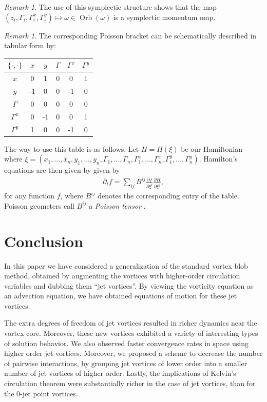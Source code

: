 \documentclass[12pt]{amsart}
\newcommand{\pder}[2]{\ensuremath{\frac{ \partial #1}{\partial #2}}}
\theoremstyle{remark}
\newtheorem{rmk}[thm]{Remark}
\DeclareMathOperator{\Orb}{Orb}
\begin{document}
\begin{rmk}
  The use of this symplectic structure shows that the map $(z_i, \Gamma_i,\Gamma_i^x,\Gamma_i^y) \mapsto \omega \in \Orb(\omega)$ is a symplectic momentum map.
\end{rmk}

\begin{rmk}
The corresponding Poisson bracket can be schematically described in tabular form by:\\
\begin{center}
\begin{tabular}{|c|c|c|c|c|c|}
\hline
	$\{ \cdot , \cdot \}$ & $x$ & $y$ & $\Gamma$ & $\Gamma^x$  & $\Gamma^y$ \\ \hline
	$x$ & 0 & 1 & 0 & 0 & 1 \\ \hline
	$y$ & -1 & 0 & 0 & -1 & 0 \\ \hline 
	$\Gamma$ & 0 & 0 & 0 & 0 & 0 \\ \hline
	$\Gamma^x$ & 0 & -1 & 0 & 0 & 1 \\ \hline
	$\Gamma^y$ & 1 & 0 & 0 & -1 & 0  \\ \hline
\end{tabular}
\end{center}

The way to use this table is as follows.  Let $H = H(\xi)$ be our Hamiltonian where
$\xi = (x_1,\dots,x_n,y_1,\dots,y_n,\Gamma_1,\dots,\Gamma_n,\Gamma_1^x,\dots,\Gamma_n^x,\Gamma_1^y,\dots,\Gamma_n^y)$.
Hamilton's equations are then given by
given by
\begin{align*}
	\partial_t f = \sum_{ij} B^{ij} \pder{f}{\xi^i} \pder{H}{\xi^j},
\end{align*}
for any function $f$, where $B^{ij}$ denotes the corresponding entry of the table.
Poisson geometers call $B^{ij}$ a \emph{Poisson tensor} \cite{FOM}.
\end{rmk}

\section{Conclusion}
\label{sec:Conclusion}
In this paper we have considered a generalization of the standard vortex blob method, obtained 
by augmenting the vortices with higher-order circulation variables
and dubbing them ``jet vortices''.
By viewing the vorticity equation as an advection equation, we have obtained equations of motion for these jet vortices.

The extra degrees of freedom of jet vortices resulted in richer dynamics near the vortex core.
Moreover, these new vortices exhibited a variety of interesting types of solution behavior.
We also observed faster convergence rates in space using higher order jet vortices.
Moreover, we proposed a scheme to decrease the number of pairwise interactions, by grouping
jet vortices of lower order into a smaller number of jet vortices of higher order.
Lastly, the implications of Kelvin's circulation theorem were substantially richer in the case of jet vortices, than for the 0-jet point vortices.
\end{document}

